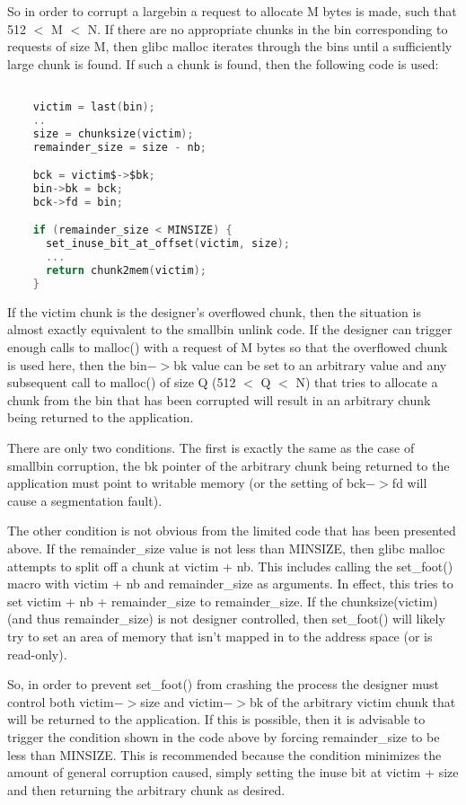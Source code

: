 \documentclass[12pt]{article}
\begin{document}
So in order to corrupt a largebin a request to allocate M bytes is
made, such that 512 $<$ M $<$ N. If there are no appropriate chunks in
the bin corresponding to requests of size M, then glibc malloc
iterates through the bins until a sufficiently large chunk is
found. If such a chunk is found, then the following code is used:

\begin{lstlisting}[language=C]

    victim = last(bin);
    ..
    size = chunksize(victim);
    remainder_size = size - nb;

    bck = victim$->$bk;
    bin->bk = bck;
    bck->fd = bin;

    if (remainder_size < MINSIZE) {
      set_inuse_bit_at_offset(victim, size);
      ...
      return chunk2mem(victim);
    }
\end{lstlisting}

If the victim chunk is the designer's overflowed chunk, then the
situation is almost exactly equivalent to the smallbin unlink code.
If the designer can trigger enough calls to malloc() with a request
of M bytes so that the overflowed chunk is used here, then the bin$->$bk value can be set to an arbitrary value and any subsequent call
to malloc() of size Q (512 $<$ Q $<$ N)  that tries to allocate a chunk
from the bin that has been corrupted will result in an arbitrary
chunk being returned to the application.
\newline


There are only two conditions. The first is exactly the same as the
case of smallbin corruption, the bk pointer of the arbitrary chunk
being returned to the application must point to writable memory (or
the setting of bck$->$fd will cause a segmentation fault).
\newline


The other condition is not obvious from the limited code that has
been presented above. If the remainder\_size value is not less than
MINSIZE, then glibc malloc attempts to split off a chunk at victim
+ nb. This includes calling the set\_foot() macro with victim + nb
and remainder\_size as arguments. In effect, this tries to set
victim + nb + remainder\_size to remainder\_size. If the
chunksize(victim) (and thus remainder\_size) is not designer
controlled, then set\_foot() will likely try to set an area of
memory that isn't mapped in to the address space (or is read-only).
\newline


So, in order to prevent set\_foot() from crashing the process the
designer must control both victim$->$size and victim$->$bk of the
arbitrary victim chunk that will be returned to the application. If
this is possible, then it is advisable to trigger the condition
shown in the code above by forcing remainder\_size to be less than
MINSIZE. This is recommended because the condition minimizes the
amount of general corruption caused, simply setting the inuse bit
at victim + size and then returning the arbitrary chunk as desired.
\newline
\end{document}
